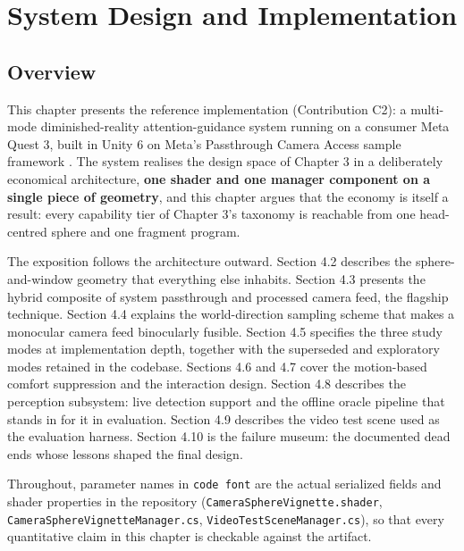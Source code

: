 \chapter{System Design and Implementation}

\section{Overview}

This chapter presents the reference implementation (Contribution C2): a multi-mode diminished-reality
attention-guidance system running on a consumer Meta Quest 3, built in Unity 6 on Meta's
Passthrough Camera Access sample framework \citep{meta2025}. The system realises the design space of Chapter 3 in a
deliberately economical architecture, \textbf{one shader and one manager component on a single piece of
geometry}, and this chapter argues that the economy is itself a result: every capability tier of
Chapter 3's taxonomy is reachable from one head-centred sphere and one fragment program.

The exposition follows the architecture outward. Section 4.2 describes the sphere-and-window
geometry that everything else inhabits. Section 4.3 presents the hybrid composite of system
passthrough and processed camera feed, the flagship technique. Section 4.4 explains the
world-direction sampling scheme that makes a monocular camera feed binocularly fusible.
Section 4.5 specifies the three study modes at implementation depth,
together with the superseded and exploratory modes retained in the codebase. Sections 4.6 and 4.7
cover the motion-based comfort suppression and the interaction design. Section 4.8 describes the
perception subsystem: live detection support and the offline oracle pipeline that stands in for it
in evaluation. Section 4.9 describes the video test scene used as the evaluation harness. Section
4.10 is the failure museum: the documented dead ends whose lessons shaped the final design.

Throughout, parameter names in \verb|code font| are the actual serialized fields and shader properties in
the repository (\verb|CameraSphereVignette.shader|, \verb|CameraSphereVignetteManager.cs|,
\verb|VideoTestSceneManager.cs|), so that every quantitative claim in this chapter is checkable against
the artifact.


